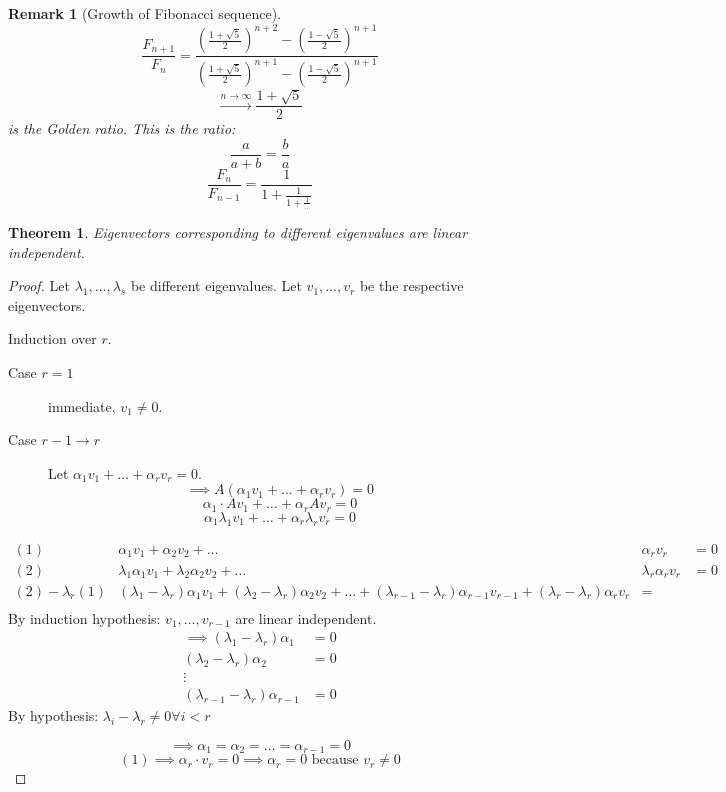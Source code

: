 \documentclass{article}
\newtheorem{theorem}{Theorem}  \numberwithin{theorem}{section}
\newtheorem{remark}{Remark}  \numberwithin{remark}{section}
\begin{document}
\begin{remark}[Growth of Fibonacci sequence]
  \[ \frac{F_{n+1}}{F_n} = \frac{\left(\frac{1 + \sqrt5}{2}\right)^{n+2} - \left(\frac{1 - \sqrt5}{2}\right)^{n+1}}{\left(\frac{1 + \sqrt5}{2}\right)^{n+1} - \left(\frac{1 - \sqrt5}{2}\right)^{n+1}} \]
  \[ \xrightarrow{n\to\infty} \frac{1 + \sqrt5}{2} \]
  is the \emph{Golden ratio}. This is the ratio:
  \[ \frac{a}{a+b} = \frac ba \]
  \[ \frac{F_n}{F_{n-1}} = \frac{1}{1 + \frac{1}{1 + \frac{1}{\dots}}} \]
\end{remark}

\begin{theorem} %
  Eigenvectors corresponding to different eigenvalues are linear independent.
\end{theorem}

\begin{proof}
  Let $\lambda_1, \dots, \lambda_s$ be different eigenvalues. Let $v_1, \dots, v_r$ be the respective eigenvectors.

  Induction over $r$.
  \begin{description}
    \item[Case $r=1$]  immediate, $v_1 \neq 0$.
    \item[Case $r-1 \to r$]
      Let $\alpha_1 v_1 + \dots + \alpha_r v_r = 0$.
      \[ \implies A (\alpha_1 v_1 + \dots + \alpha_r v_r) = 0 \]
      \[ \alpha_1 \cdot A v_1 + \dots + \alpha_r A v_r = 0 \]
      \[ \alpha_1 \lambda_1 v_1 + \dots + \alpha_r \lambda_r v_r = 0 \]
  \end{description}

  \begin{align*}
    (1) & \alpha_1 v_1 + \alpha_2 v_2 + \dots & \alpha_r v_r &= 0 \\
    (2) & \lambda_1 \alpha_1 v_1 + \lambda_2 \alpha_2 v_2 + \dots & \lambda_r \alpha_r v_r &= 0 \\
    \hline
    (2) - \lambda_r (1) & (\lambda_1 - \lambda_r) \alpha_1 v_1 + (\lambda_2 - \lambda_r) \alpha_2 v_2 + \dots + (\lambda_{r-1} - \lambda_r) \alpha_{r-1} v_{r-1} + (\lambda_r - \lambda_r) \alpha_r v_r &= \\
  \end{align*}
  By induction hypothesis: $v_1, \dots, v_{r-1}$ are linear independent.
  \begin{align*}
    \implies (\lambda_1 - \lambda_r) \alpha_1 &= 0 \\
    (\lambda_2 - \lambda_r) \alpha_2 &= 0 \\
    \vdots & \\
    (\lambda_{r-1} - \lambda_r) \alpha_{r-1} &= 0
  \end{align*}
  By hypothesis: $\lambda_i - \lambda_r \neq 0 \forall i < r$

  \[ \implies \alpha_1 = \alpha_2 = \dots = \alpha_{r-1} = 0 \]
  \[ (1) \implies \alpha_r \cdot v_r = 0 \implies \alpha_r = 0 \text{ because } v_r \neq 0 \]
\end{proof}
\end{document}

